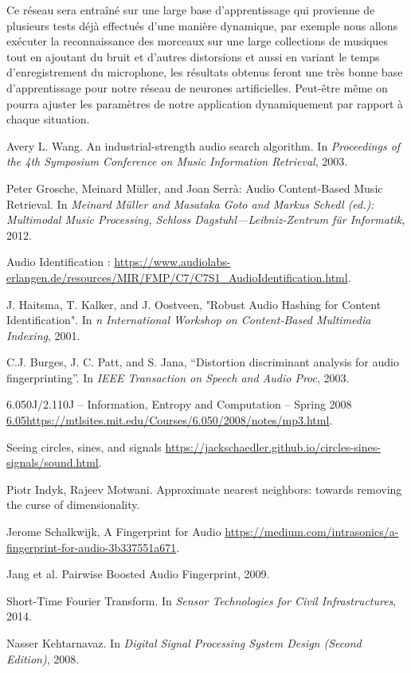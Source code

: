 \documentclass[10pt, english]{report}
\begin{document}
Ce réseau sera entraîné sur une large base d'apprentissage qui provienne de plusieurs tests déjà effectués d'une manière dynamique, par exemple nous allons exécuter la reconnaissance des morceaux sur une large collections de musiques tout en ajoutant du bruit et d'autres distorsions et aussi en variant le temps d'enregistrement du microphone, les résultats obtenus feront une très bonne base d'apprentissage pour notre réseau de neurones artificielles. Peut-être même on pourra ajuster les paramètres de notre application dynamiquement par rapport à chaque situation.\\


\begin{thebibliography}{100}
	 
	 Avery L. Wang. An industrial-strength audio search algorithm. In \emph{Proceedings of the 4th Symposium Conference on Music Information Retrieval}, 2003.
	
	 Peter Grosche, Meinard Müller, and Joan Serrà: Audio Content-Based Music Retrieval. In \emph{Meinard Müller and Masataka Goto and Markus Schedl (ed.): Multimodal Music Processing, Schloss Dagstuhl—Leibniz-Zentrum für Informatik}, 2012.
	
	 Audio Identification : \href{https://www.audiolabs-erlangen.de/resources/MIR/FMP/C7/C7S1_AudioIdentification.html}{https://www.audiolabs-erlangen.de/resources/MIR/FMP/C7/C7S1\_AudioIdentification.html}.
	
	  J. Haitsma, T. Kalker, and J. Oostveen, "Robust Audio
	Hashing for Content Identification". In \emph{n International Workshop on
		Content-Based Multimedia Indexing}, 2001.
	
	  C.J. Burges, J. C. Patt, and S. Jana, “Distortion
	discriminant analysis for audio fingerprinting”. In \emph{IEEE
		Transaction on Speech and Audio Proc}, 2003.
	
	 6.050J/2.110J – Information, Entropy and Computation – Spring 2008  \href{https://mtlsites.mit.edu/Courses/6.050/2008/notes/mp3.html}{6.05https://mtlsites.mit.edu/Courses/6.050/2008/notes/mp3.html}.
	
	 Seeing circles, sines, and signals \href{https://jackschaedler.github.io/circles-sines-signals/sound.html}{https://jackschaedler.github.io/circles-sines-signals/sound.html}.
	
	  Piotr Indyk, Rajeev Motwani. Approximate nearest neighbors: towards removing the curse of dimensionality.
	
	 Jerome Schalkwijk, A Fingerprint for Audio \href{https://medium.com/intrasonics/a-fingerprint-for-audio-3b337551a671}{https://medium.com/intrasonics/a-fingerprint-for-audio-3b337551a671}.
	
	 Jang et al. Pairwise Boosted Audio Fingerprint, 2009.
	
	 Short-Time Fourier Transform. In \emph{Sensor Technologies for Civil Infrastructures}, 2014.
	
	 Nasser Kehtarnavaz. In \emph{Digital Signal Processing System Design (Second Edition)}, 2008.
	
\end{thebibliography}
\end{document}
